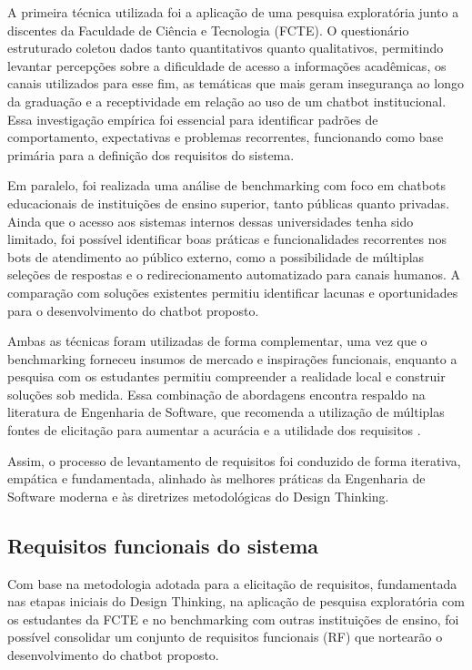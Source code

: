 A primeira técnica utilizada foi a aplicação de uma pesquisa exploratória junto a discentes da Faculdade de Ciência e Tecnologia (FCTE). O questionário estruturado coletou dados tanto quantitativos quanto qualitativos, permitindo levantar percepções sobre a dificuldade de acesso a informações acadêmicas, os canais utilizados para esse fim, as temáticas que mais geram insegurança ao longo da graduação e a receptividade em relação ao uso de um chatbot institucional. Essa investigação empírica foi essencial para identificar padrões de comportamento, expectativas e problemas recorrentes, funcionando como base primária para a definição dos requisitos do sistema.

Em paralelo, foi realizada uma análise de benchmarking com foco em chatbots educacionais de instituições de ensino superior, tanto públicas quanto privadas. Ainda que o acesso aos sistemas internos dessas universidades tenha sido limitado, foi possível identificar boas práticas e funcionalidades recorrentes nos bots de atendimento ao público externo, como a possibilidade de múltiplas seleções de respostas e o redirecionamento automatizado para canais humanos. A comparação com soluções existentes permitiu identificar lacunas e oportunidades para o desenvolvimento do chatbot proposto.

Ambas as técnicas foram utilizadas de forma complementar, uma vez que o benchmarking forneceu insumos de mercado e inspirações funcionais, enquanto a pesquisa com os estudantes permitiu compreender a realidade local e construir soluções sob medida. Essa combinação de abordagens encontra respaldo na literatura de Engenharia de Software, que recomenda a utilização de múltiplas fontes de elicitação para aumentar a acurácia e a utilidade dos requisitos \cite{pressman2016engenharia}.

Assim, o processo de levantamento de requisitos foi conduzido de forma iterativa, empática e fundamentada, alinhado às melhores práticas da Engenharia de Software moderna e às diretrizes metodológicas do Design Thinking.

\subsection{Requisitos funcionais do sistema}

Com base na metodologia adotada para a elicitação de requisitos, fundamentada nas etapas iniciais do Design Thinking, na aplicação de pesquisa exploratória com os estudantes da FCTE e no benchmarking com outras instituições de ensino, foi possível consolidar um conjunto de requisitos funcionais (RF) que nortearão o desenvolvimento do chatbot proposto.

